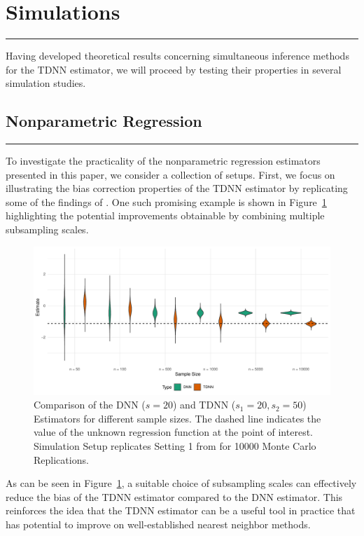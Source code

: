 \section{Simulations}\label{sec:simulations}
\hrule

Having developed theoretical results concerning simultaneous inference methods for the TDNN estimator, we will proceed by testing their properties in several simulation studies.

\subsection{Nonparametric Regression}
\hrule
To investigate the practicality of the nonparametric regression estimators presented in this paper, we consider a collection of setups.
First, we focus on illustrating the bias correction properties of the TDNN estimator by replicating some of the findings of \citet{demirkaya_optimal_2024}.
One such promising example is shown in Figure~\ref{fig:TDNN_bias_cor} highlighting the potential improvements obtainable by combining multiple subsampling scales.
\begin{figure}[H]
	\centering
	\includegraphics[width = \textwidth]{../Code/Simulations/Graphics/TDNN_DNN.pdf}
	\caption{Comparison of the DNN ($s = 20$) and TDNN ($s_1 = 20, s_2 = 50$) Estimators for different sample sizes.
		The dashed line indicates the value of the unknown regression function at the point of interest.
		Simulation Setup replicates Setting 1 from \citet{demirkaya_optimal_2024} for 10000 Monte Carlo Replications.}
	\label{fig:TDNN_bias_cor}
\end{figure}
As can be seen in Figure~\ref{fig:TDNN_bias_cor}, a suitable choice of subsampling scales can effectively reduce the bias of the TDNN estimator compared to the DNN estimator.
This reinforces the idea that the TDNN estimator can be a useful tool in practice that has potential to improve on well-established nearest neighbor methods.

